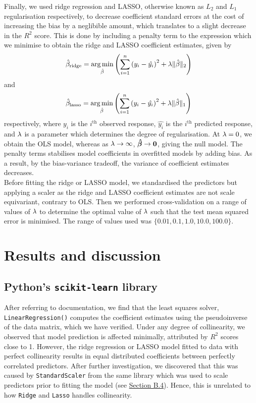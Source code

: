 \documentclass[12pt]{article}
\DeclareMathOperator*{\argmin}{arg\,min}
\newcommand{\gbh}{\hat{\gb}}
\newcommand{\bmgbh}{\boldsymbol{\gbh}}
\begin{document}
	Finally, we used ridge regression and LASSO, otherwise known as $L_2$ and $L_1$ regularisation respectively, to decrease coefficient standard errors at the cost of increasing the bias by a neglibible amount, which translates to a slight decrease in the $R^2$ score. This is done by including a penalty term to the expression which we minimise to obtain the ridge and LASSO coefficient estimates, given by
	\begin{equation}
		\gbh_{\text{ridge}}=\argmin_{\gbh}\lt( \sum_{i=1}^{n}\lt(y_i-\hat{y_i}\rt)^2+\lm\|\gbh\|_2\rt) 
	\end{equation}
	and
	\begin{equation}
		\gbh_{\text{lasso}}=\argmin_{\gbh}\lt( \sum_{i=1}^{n}\lt(y_i-\hat{y_i}\rt)^2+\lm\|\gbh\|_1\rt)
	\end{equation}
	respectively, where $y_i$ is the $i^{\text{th}}$ observed response, $\hat{y_i}$ is the $i^{\text{th}}$ predicted response, and $\lambda$ is a parameter which determines the degree of regularisation. At $\lambda=0$, we obtain the OLS model, whereas as $\lambda\rightarrow\infty$, $\bmgbh\rightarrow \bzero$, giving the null model. The penalty terms stabilises model coefficients in overfitted models by adding bias. As a result, by the bias-variance tradeoff, the variance of coefficient estimates decreases.\\

	Before fitting the ridge or LASSO model, we standardised the predictors but applying a scaler as the ridge and LASSO coefficient estimates are not scale equivariant, contrary to OLS. Then we performed cross-validation on a range of values of $\lambda$ to determine the optimal value of $\lambda$ such that the test mean squared error is minimised. The range of values used was $\{0.01,0.1,1.0,10.0,100.0\}$. 
	
	
	\section{Results and discussion}
	\subsection{Python's \texttt{scikit-learn} library}
	
	After referring to documentation, we find that the least squares solver, \texttt{LinearRegression()} computes the coefficient estimates using the pseudoinverse of the data matrix, which we have verified. Under any degree of collinearity, we observed that model prediction is affected minimally, attributed by $R^2$ scores close to 1. However, the ridge regression or LASSO model fitted to data with perfect collinearity results in equal distributed coefficients between perfectly correlated predictors. After further investigation, we discovered that this was caused by \texttt{StandardScaler} from the same library which was used to scale predictors prior to fitting the model (see \hyperref[sec:append4]{Section B.4}). Hence, this is unrelated to how \texttt{Ridge} and \texttt{Lasso} handles collinearity.\\
	
\end{document}

